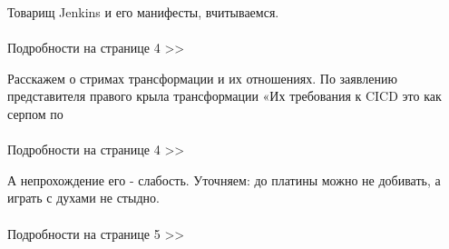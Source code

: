 \documentclass{article}
\begin{document}
\begin{multicols}{3}

Товарищ Jenkins и его манифесты, вчитываемся.
\\\\Подробности на странице 4 >>
\vspace{8mm}
\closearticle

Расскажем о стримах трансформации и их отношениях. По заявлению представителя правого крыла трансформации «Их требования к CICD это как серпом по
\\\\Подробности на странице 4 >>
\vspace{7mm}
\closearticle

А непрохождение его - слабость. Уточняем: до платины можно не добивать, а играть с духами не стыдно.
\\\\Подробности на странице 5 >>
\closearticle

\end{multicols}
\end{document}
